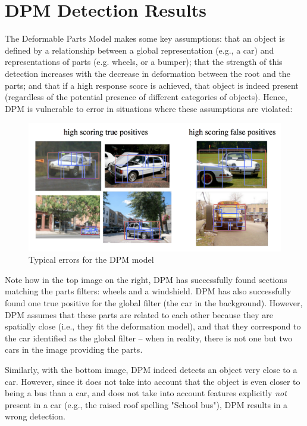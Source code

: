 \documentclass{article}
\begin{document}
\section{DPM Detection Results}

The Deformable Parts Model makes some key assumptions: that an object is defined by a relationship between a global representation (e.g., a car) and representations of parts (e.g. wheels, or a bumper); that the strength of this detection increases with the decrease in deformation between the root and the parts; and that if a high response score is achieved, that object is indeed present (regardless of the potential presence of different categories of objects). Hence, DPM is vulnerable to error in situations where these assumptions are violated:

\begin{figure}[h!]
	\center
	\includegraphics[scale=0.6]{results-tpfp.png}
    \caption{Typical errors for the DPM model}
    \label{fig:results-tpfp}
\end{figure}



Note how in the top image on the right, DPM has successfully found sections matching the parts filters: wheels and a windshield. DPM has also successfully found one true positive for the global filter (the car in the background). However, DPM assumes that these parts are related to each other because they are spatially close (i.e., they fit the deformation model), and that they correspond to the car identified as the global filter -- when in reality, there is not one but two cars in the image providing the parts.

Similarly, with the bottom image, DPM indeed detects an object very close to a car. However, since it does not take into account that the object is even closer to being a bus than a car, and does not take into account features explicitly \textit{not} present in a car (e.g., the raised roof spelling "School bus"), DPM results in a wrong detection.
\end{document}
